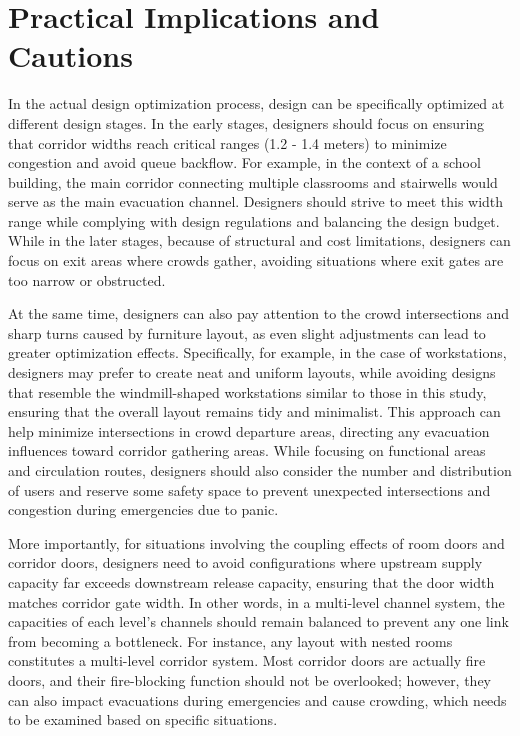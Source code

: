 \section{Practical Implications and Cautions}

In the actual design optimization process, design can be specifically optimized at different design stages. In the early stages, designers should focus on ensuring that corridor widths reach critical ranges (1.2 - 1.4 meters) to minimize congestion and avoid queue backflow. For example, in the context of a school building, the main corridor connecting multiple classrooms and stairwells would serve as the main evacuation channel. Designers should strive to meet this width range while complying with design regulations and balancing the design budget. While in the later stages, because of structural and cost limitations, designers can focus on exit areas where crowds gather, avoiding situations where exit gates are too narrow or obstructed.

At the same time, designers can also pay attention to the crowd intersections and sharp turns caused by furniture layout, as even slight adjustments can lead to greater optimization effects. Specifically, for example, in the case of workstations, designers may prefer to create neat and uniform layouts, while avoiding designs that resemble the windmill-shaped workstations similar to those in this study, ensuring that the overall layout remains tidy and minimalist. This approach can help minimize intersections in crowd departure areas, directing any evacuation influences toward corridor gathering areas. While focusing on functional areas and circulation routes, designers should also consider the number and distribution of users and reserve some safety space to prevent unexpected intersections and congestion during emergencies due to panic.

More importantly, for situations involving the coupling effects of room doors and corridor doors, designers need to avoid configurations where upstream supply capacity far exceeds downstream release capacity, ensuring that the door width matches corridor gate width. In other words, in a multi-level channel system, the capacities of each level's channels should remain balanced to prevent any one link from becoming a bottleneck. For instance, any layout with nested rooms constitutes a multi-level corridor system. Most corridor doors are actually fire doors, and their fire-blocking function should not be overlooked; however, they can also impact evacuations during emergencies and cause crowding, which needs to be examined based on specific situations.

